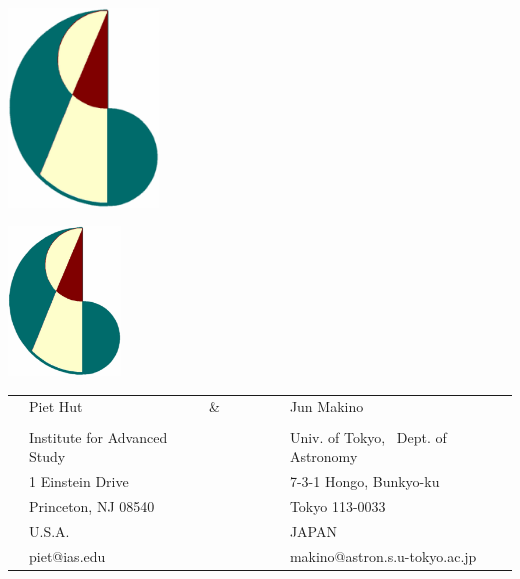  \begin{latexonly}
 \begin{center}
 \leavevmode
 \includegraphics[width=4cm]{acstitle.eps}
 \end{center}
 \end{latexonly}


\begin{htmlonly}
\begin{center}
\includegraphics[width=3cm]{acstitle.eps}
\end{center}
\end{htmlonly}

\bigskip\bigskip\bigskip


\begin{center}
\begin{tabular}{llllllll}
& {\LARGE Piet Hut} & {\LARGE \&} & & & & & {\LARGE Jun Makino}\\
&  & & & & & & \\
& {\large Institute for Advanced Study} & & & & & &
  {\large Univ. of Tokyo, \ Dept. of Astronomy}\\
& {\large 1 Einstein Drive} & & & & & & {\large 7-3-1 Hongo, Bunkyo-ku}\\
& {\large Princeton, NJ 08540} & & & & & & {\large Tokyo 113-0033}\\
& {\large U.S.A.} & & & & & & {\large JAPAN}\\
& {\large piet@ias.edu} & & & & & & {\large makino@astron.s.u-tokyo.ac.jp}\\
\end{tabular}

\bigskip\bigskip\bigskip\bigskip

\end{center}
